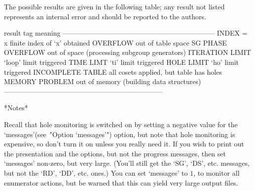 
The possible results are given in the following table; any result  not
listed represents an internal error and  should  be  reported  to  the
{\ACE} authors.

\begintt
result tag           meaning 
------------------------------------------------------------------
INDEX = x            finite index of `x' obtained
OVERFLOW             out of table space
SG PHASE OVERFLOW    out of space (processing subgroup generators)
ITERATION LIMIT      `loop' limit triggered
TIME LIMT            `ti' limit triggered
HOLE LIMIT           `ho' limit triggered
INCOMPLETE TABLE     all cosets applied, but table has holes
MEMORY PROBLEM       out of memory (building data structures)
---------------------------------------------------------------------
\endtt


*Notes*

Recall that hole monitoring is switched on by setting a negative value
for the `messages'(see~"Option `messages'") option, but note that hole
monitoring is expensive, so don't turn it on unless  you  really  need
it. If you wish to print out the presentation and the options, but not
the progress messages, then set `messages' non-zero, but  very  large.
(You'll still get the `SG', `DS', etc. messages,  but  not  the  `RD',
`DD', etc. ones.) You can  set  `messages'  to  $1$,  to  monitor  all
enumerator actions, but be warned  that  this  can  yield  very  large
output files.

